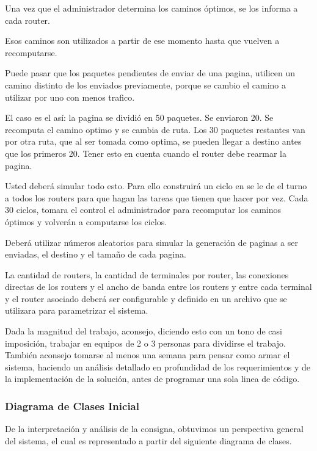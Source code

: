 \documentclass[12pt]{article} %
\begin{document}
Una vez que el administrador determina los caminos óptimos, se los informa a cada router.

Esos caminos son utilizados a partir de ese momento hasta que vuelven a recomputarse.

Puede pasar que los paquetes pendientes de enviar de una pagina, utilicen un camino distinto de los enviados previamente, porque se cambio el camino a utilizar por uno con menos trafico.

El caso es el así: la pagina se dividió en 50 paquetes. Se enviaron 20. Se recomputa el camino optimo y se cambia de ruta. Los 30 paquetes restantes van por otra ruta, que al ser tomada como optima, se pueden llegar a destino antes que los primeros 20. Tener esto en cuenta cuando el router debe rearmar la pagina.

Usted deberá simular todo esto. Para ello construirá un ciclo en se le de el turno a todos los routers para que hagan las tareas que tienen que hacer por vez. Cada 30 ciclos, tomara el control el administrador para recomputar los caminos óptimos y volverán a computarse los ciclos.

Deberá utilizar números aleatorios para simular la generación de paginas a ser enviadas, el destino y el tamaño de cada pagina.

La cantidad de routers, la cantidad de terminales por router, las conexiones directas de los routers y el ancho de banda entre los routers y entre cada terminal y el router asociado deberá ser configurable y definido en un archivo que se utilizara para parametrizar el sistema.

Dada la magnitud del trabajo, aconsejo, diciendo esto con un tono de casi imposición, trabajar en equipos de 2 o 3 personas para dividirse el trabajo. También aconsejo tomarse al menos una semana para pensar como armar el sistema, haciendo un análisis detallado en profundidad de los requerimientos y de la implementación de la solución, antes de programar una sola linea de código.

\subsubsection{Diagrama de Clases Inicial}
De la interpretación y análisis de la consigna, obtuvimos un perspectiva general del sistema, el cual es representado a partir del siguiente diagrama de clases.
\end{document}
